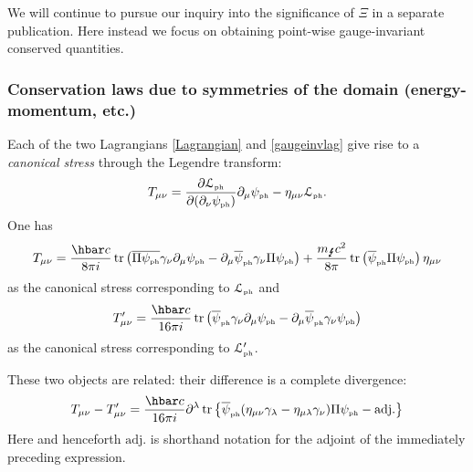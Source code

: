 \documentclass[11pt]{article}
\theoremstyle{definition}
\DeclareMathOperator{\tr}{tr}
\numberwithin{equation}{section}
\newcommand{\beq}{\begin{equation}}
\newcommand{\eeq}{\end{equation}}
\newcommand{\p}{\partial}
\newcommand{\cLph}{{\mathcal L}_{\mbox{\tiny{ph}}}}
\newcommand{\psiPH}{{\psi_{\mbox{\rm\tiny ph}}}}
\newcommand{\psiPHb}{{\overline\psi_{\mbox{\rm\tiny ph}}}}
\newcommand{\mPH}{{m_{\mbox{\Lightning}}}}
\newcommand{\la}{\lambda}
\newcommand{\ga}{\gamma}
\begin{document}
 We will continue to pursue our inquiry into the significance of $\Xi$ in a separate publication. 
 Here instead we focus on obtaining point-wise gauge-invariant conserved quantities.    


\subsubsection{Conservation laws due to symmetries of the domain (energy-momentum, etc.)}\label{sec:energymom}
 Each of the two Lagrangians \eqref{Lagrangian} and \eqref{gaugeinvlag} give rise to a {\em canonical stress} 
\cite{Chr2000} through the Legendre transform:
\beq  T_{\mu\nu} = \frac{\p \cLph}{\p (\p_\nu \psiPH)}\p_\mu\psiPH - \eta_{\mu\nu} \cLph.\eeq
One has
\beq \label{Tmunu}
T_{\mu\nu} = \frac{\hbar c}{8 \pi i} \tr \left( \overline{\Pi\psiPH}\ga_\nu\p_\mu \psiPH - \p_\mu \psiPHb \ga_\nu \Pi\psiPH \right) 
+\frac{\mPH c^2}{8\pi} \tr\left( \psiPHb \Pi \psiPH \right) \eta_{\mu\nu}
\eeq
as the canonical stress corresponding to $\cLph$ and
\beq \label{Tprimemunu}
T'_{\mu\nu} = \frac{\hbar c}{16 \pi i} \tr \left( \psiPHb \ga_\nu \p_\mu \psiPH - \p_\mu \psiPHb \ga_\nu \psiPH\right)
\eeq
as the canonical stress corresponding to $\cLph'$.   

These two objects are related: their difference is a complete divergence:
\beq \label{TTprimediff}
T_{\mu\nu} - T'_{\mu\nu} = 
\frac{\hbar c}{16 \pi i}\p^\la\tr\left\{  \psiPHb(\eta_{\mu\nu}\ga_\la - \eta_{\mu\la}\ga_\nu )\Pi\psiPH - \mbox{adj.}\right\}
\eeq
Here and henceforth $\mbox{adj.}$ is shorthand notation for the adjoint of the immediately preceding expression.
\end{document}
